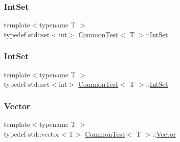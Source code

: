 \subsubsection{\texorpdfstring{IntSet}{IntSet}\hspace{0.1cm}{\footnotesize\ttfamily [2/3]}}
{\footnotesize\ttfamily template$<$typename T $>$ \\
typedef std\+::set$<$int$>$ \mbox{\hyperlink{class_common_test}{Common\+Test}}$<$ T $>$\+::\mbox{\hyperlink{class_common_test_a62827e9d3064cddf4a8698747f1bd434}{Int\+Set}}\hspace{0.3cm}{\ttfamily [protected]}}

\mbox{\label{class_common_test_a62827e9d3064cddf4a8698747f1bd434}} 
\subsubsection{\texorpdfstring{IntSet}{IntSet}\hspace{0.1cm}{\footnotesize\ttfamily [3/3]}}
{\footnotesize\ttfamily template$<$typename T $>$ \\
typedef std\+::set$<$int$>$ \mbox{\hyperlink{class_common_test}{Common\+Test}}$<$ T $>$\+::\mbox{\hyperlink{class_common_test_a62827e9d3064cddf4a8698747f1bd434}{Int\+Set}}\hspace{0.3cm}{\ttfamily [protected]}}

\mbox{\label{class_common_test_a6dfdcede6964887b9f4254a0e0478e37}} 
\subsubsection{\texorpdfstring{Vector}{Vector}\hspace{0.1cm}{\footnotesize\ttfamily [1/3]}}
{\footnotesize\ttfamily template$<$typename T $>$ \\
typedef std\+::vector$<$T$>$ \mbox{\hyperlink{class_common_test}{Common\+Test}}$<$ T $>$\+::\mbox{\hyperlink{class_common_test_a6dfdcede6964887b9f4254a0e0478e37}{Vector}}\hspace{0.3cm}{\ttfamily [protected]}}

\mbox{\label{class_common_test_a6dfdcede6964887b9f4254a0e0478e37}} 
